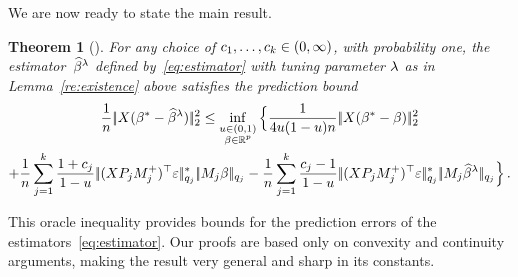 \documentclass[bj]{imsart}
\newcommand{\normtwo}[1]{\ensuremath{\!|\!| #1 | \! |_{2}}}
\newcommand{\normqj}[1]{\ensuremath{\!|\!| #1 | \! |_{q_j}}}
\newcommand{\normqjd}[1]{\ensuremath{\!|\!| #1 | \! |_{q_j}^*}}
\newtheorem{theorem}{Theorem}[section]
\newcommand{\1}{{\rm 1}\mskip -4,5mu{\rm l} }
\def\R{\mathbb{R}}
\newcommand{\betatrue}{\beta^*}
\newcommand{\genbeta}{\textcolor{black}{\beta}}
\newcommand{\genconstant}{\textcolor{black}{\ensuremath{u}}}
\begin{document}
We are now ready to state the main result.
\begin{theorem}[\Pbo]\label{r:finalbound}
For any choice of $\textcolor{black}{c}_1,\dots,\textcolor{black}{c}_{k}\in(0,\infty)$, with probability one, the estimator~$\widehat \beta^{\lambda}$ defined by~\eqref{eq:estimator} with tuning parameter $\lambda$ as in Lemma~\ref{re:existence} above satisfies the prediction bound
 \begin{multline*}
\frac{1}{n}\,\normtwo{\design(\betatrue-\estimatort)}^2\le\inf_{\substack{\genconstant\in(0,1)\\\genbeta\in\R^p}} \Big\{\frac{1}{4\genconstant(1-\genconstant)n}\,\normtwo{\design(\betatrue-\genbeta)}^2\\+\frac{1}{n}\sum_{j=1}^{\numbergroups}\frac{1+\tuningrelax_j}{1-\genconstant}\,  \normqjd{(\design  \projectionmatrix_j\fusedmatrix_j^{+})^\top\noise}  \, \normqj{\fusedmatrix_j \genbeta}- \frac{1}{n}\sum_{j=1}^{\numbergroups}\frac{\tuningrelax_j-1}{1-\genconstant}\, \normqjd{(\design  \projectionmatrix_j\fusedmatrix_j^{+})^\top\noise} \,  \normqj{\fusedmatrix_j \estimatort}\Big\}\,.
\end{multline*}
\end{theorem}
\noindent  This oracle inequality provides bounds for the prediction errors of the estimators~\eqref{eq:estimator}. Our proofs are based only on convexity and continuity arguments, making the result very general and sharp in its constants.
\end{document}
